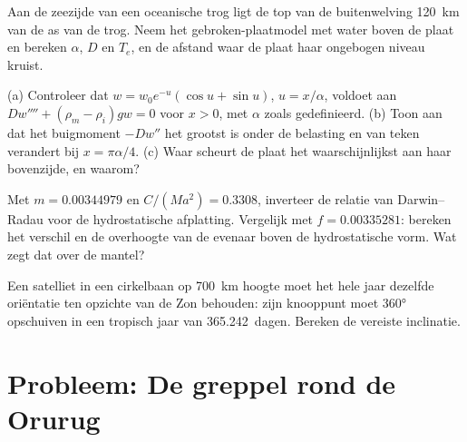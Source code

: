 \begin{exercise}[$\star\star$]\label{exo:b3:gravity-geodesy:9}
Aan de zeezijde van een oceanische trog ligt de top van de buitenwelving \qty{120}{km} van de
as van de trog. Neem het gebroken-plaatmodel met water boven de plaat en bereken
$\alpha$, $D$ en $T_e$, en de afstand waar de plaat haar ongebogen
niveau kruist.
\end{exercise}

\begin{exercise}[$\star\star\star$]\label{exo:b3:gravity-geodesy:10}
(a) Controleer dat $w = w_0e^{-u}(\cos u + \sin u)$, $u = x/\alpha$, voldoet aan
$Dw'''' + (\rho_m - \rho_i)gw = 0$ voor $x > 0$, met $\alpha$ zoals gedefinieerd.
(b) Toon aan dat het buigmoment $-Dw''$ het grootst is onder de belasting en van teken verandert
bij $x = \pi\alpha/4$. (c) Waar scheurt de plaat het waarschijnlijkst aan
haar bovenzijde, en waarom?
\end{exercise}

\begin{exercise}[$\star\star\star$]\label{exo:b3:gravity-geodesy:11}
Met $m = \num{0.00344979}$ en $C/(Ma^2) = \num{0.3308}$, inverteer de
relatie van Darwin--Radau voor de hydrostatische afplatting. Vergelijk met
$f = \num{0.00335281}$: bereken het verschil en de overhoogte van de
evenaar boven de hydrostatische vorm. Wat zegt dat over de mantel?
\end{exercise}

\begin{exercise}[$\star\star\star$]\label{exo:b3:gravity-geodesy:12}
Een satelliet in een cirkelbaan op \qty{700}{km} hoogte moet het hele jaar dezelfde
oriëntatie ten opzichte van de Zon behouden: zijn knooppunt moet \ang{360} opschuiven
in een tropisch jaar van \num{365.242}~dagen. Bereken de vereiste inclinatie.
\end{exercise}

\section{Probleem: De greppel rond de Orurug}

